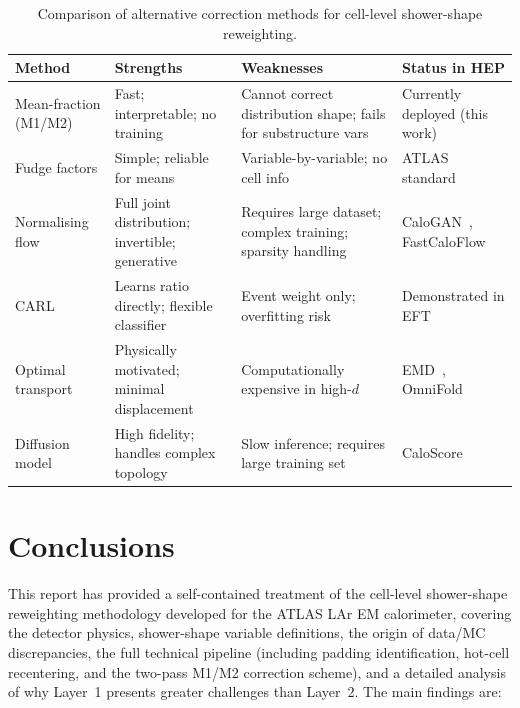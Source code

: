 \documentclass[11pt,a4paper]{article}
\begin{document}
\begin{table}[htbp]
  \centering
  \caption{Comparison of alternative correction methods for
           cell-level shower-shape reweighting.}
  \label{tab:method_comparison}
  \small
  \begin{tabular}{lp{2.8cm}p{2.8cm}p{3.0cm}}
    \toprule
    Method & Strengths & Weaknesses & Status in HEP \\
    \midrule
    Mean-fraction (M1/M2) &
      Fast; interpretable; no training &
      Cannot correct distribution shape; fails for substructure vars &
      Currently deployed (this work) \\[4pt]
    Fudge factors &
      Simple; reliable for means &
      Variable-by-variable; no cell info &
      ATLAS standard \\[4pt]
    Normalising flow &
      Full joint distribution; invertible; generative &
      Requires large dataset; complex training; sparsity handling &
      CaloGAN~\cite{CaloGAN:2018}, FastCaloFlow \\[4pt]
    CARL &
      Learns ratio directly; flexible classifier &
      Event weight only; overfitting risk &
      Demonstrated in EFT~\cite{CARL:2016,Rizvi:2023} \\[4pt]
    Optimal transport &
      Physically motivated; minimal displacement &
      Computationally expensive in high-$d$ &
      EMD~\cite{Komiske:2019}, OmniFold~\cite{OmniFold:2020} \\[4pt]
    Diffusion model &
      High fidelity; handles complex topology &
      Slow inference; requires large training set &
      CaloScore~\cite{CaloScore:2022} \\
    \bottomrule
  \end{tabular}
\end{table}


\section{Conclusions}
\label{sec:conclusions}

This report has provided a self-contained treatment of the
cell-level shower-shape reweighting methodology developed for the
ATLAS LAr EM calorimeter, covering the detector physics, shower-shape
variable definitions, the origin of data/MC discrepancies, the full
technical pipeline (including padding identification, hot-cell
recentering, and the two-pass M1/M2 correction scheme), and a
detailed analysis of why Layer~1 presents greater challenges
than Layer~2.  The main findings are:
\end{document}
